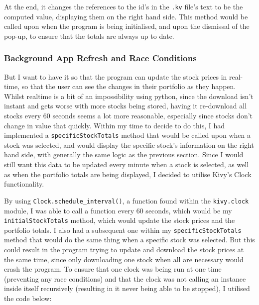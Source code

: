 \documentclass{article}
\begin{document}
\vspace{0.3cm}
At the end, it changes the references to the id's in the \texttt{.kv} file's text to be the computed value, displaying them on the right hand side. This method would be called upon when the program is being initialised, and upon the dismissal of the pop-up, to ensure that the totals are always up to date.\\\vspace{0.3cm}

\subsubsection{Background App Refresh and Race Conditions}
But I want to have it so that the program can update the stock prices in real-time, so that the user can see the changes in their portfolio as they happen. Whilst realtime is a bit of an impossibility using python, since the download isn't instant and gets worse with more stocks being stored, having it re-download all stocks every 60 seconds seems a lot more reasonable, especially since stocks don't change in value that quickly. Within my time to decide to do this, I had implemented a \texttt{specificStockTotals} method that would be called upon when a stock was selected, and would display the specific stock's information on the right hand side, with generally the same logic as the previous section. Since I would still want this data to be updated every minute when a stock is selected, as well as when the portfolio totals are being displayed, I decided to utilise Kivy's Clock functionality.\\\vspace{0.3cm}

By using \texttt{Clock.schedule\_interval()}, a function found within the \texttt{kivy.clock} module, I was able to call a function every 60 seconds, which would be my \texttt{initialStockTotals} method, which would update the stock prices and the portfolio totals. I also had a subsequent one within my \texttt{specificStockTotals} method that would do the same thing when a specific stock was selected. But this could result in the program trying to update and download the stock prices at the same time, since only downloading one stock when all are necessary would crash the program. To ensure that one clock was being run at one time (preventing any race conditions) and that the clock was not calling an instance inside itself recursively (resulting in it never being able to be stopped), I utilised the code below: \\\vspace{0.3cm}
\end{document}
